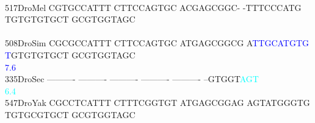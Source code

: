 \documentclass[11pt,twoside,reqno,a4paper]{article}
\begin{document}
{\\
517\hspace*{2\charwidth}DroMel	CGTGCCATTT	CTTCCAGTGC	ACGAGCGGC-	-TTTCCCATG	TGTGTGTGCT	GCGTGGTAGC	\\
\hspace*{5\charwidth}\hspace*{7\charwidth}\hspace*{1\charwidth}\hspace*{1\charwidth}\hspace*{1\charwidth}\hspace*{1\charwidth}\hspace*{1\charwidth}\hspace*{1\charwidth}\\
508\hspace*{2\charwidth}DroSim	CGCGCCATTT	CTTCCAGTGC	ATGAGCGGCG	A\textcolor{blue}{T}\textcolor{blue}{T}\textcolor{blue}{G}\textcolor{blue}{C}\textcolor{blue}{A}\textcolor{blue}{T}\textcolor{blue}{G}\textcolor{blue}{T}\textcolor{blue}{G}	\textcolor{blue}{T}GTGTGTGCT	GCGTGGTAGC	\\
\hspace*{5\charwidth}\hspace*{7\charwidth}\hspace*{1\charwidth}\hspace*{1\charwidth}\hspace*{1\charwidth}\hspace*{31\charwidth}\textcolor{blue}{7.6}\hspace*{1\charwidth}\hspace*{1\charwidth}\hspace*{1\charwidth}\\
335\hspace*{2\charwidth}DroSec	----------	----------	----------	----------	----------	--GTGGT\textcolor{cyan}{A}\textcolor{cyan}{G}\textcolor{cyan}{T}	\\
\hspace*{5\charwidth}\hspace*{7\charwidth}\hspace*{1\charwidth}\hspace*{1\charwidth}\hspace*{1\charwidth}\hspace*{1\charwidth}\hspace*{1\charwidth}\hspace*{57\charwidth}\textcolor{cyan}{6.4}\hspace*{1\charwidth}\\
547\hspace*{2\charwidth}DroYak	CGCCTCATTT	CTTTCGGTGT	ATGAGCGGAG	AGTATGGGTG	TGTGCGTGCT	GCGTGGTAGC	\\
}
\end{document}
